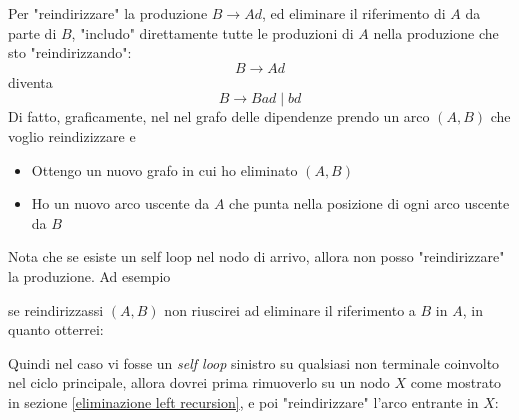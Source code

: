Per "reindirizzare" la produzione $ B \rightarrow Ad $, ed eliminare il riferimento di $ A $ da parte di $ B $, "includo" direttamente tutte le produzioni di $ A $ nella produzione che sto "reindirizzando":
\[
	B \rightarrow Ad
\]
diventa
\[
	B \rightarrow Bad \mid bd
\]
Di fatto, graficamente, nel nel grafo delle dipendenze prendo un arco $ \left(A, B\right) $ che voglio reindizizzare e
\begin{itemize}
	\item Ottengo un nuovo grafo in cui ho eliminato $ \left(A, B\right) $
	\item Ho un nuovo arco uscente da $ A $ che punta nella posizione di ogni arco uscente da $ B $
\end{itemize}
Nota che se esiste un self loop nel nodo di arrivo, allora non posso "reindirizzare" la produzione. Ad esempio
\begin{center}
\end{center}
se reindirizzassi $ \left(A, B\right) $ non riuscirei ad eliminare il riferimento a $ B $ in $ A $, in quanto otterrei:

\begin{center}
\end{center}

Quindi nel caso vi fosse un \textit{self loop} sinistro su qualsiasi non terminale coinvolto nel ciclo principale, allora dovrei prima rimuoverlo su un nodo $ X $ come mostrato in sezione \ref{eliminazione left recursion}, e poi "reindirizzare" l'arco entrante in $ X $:


